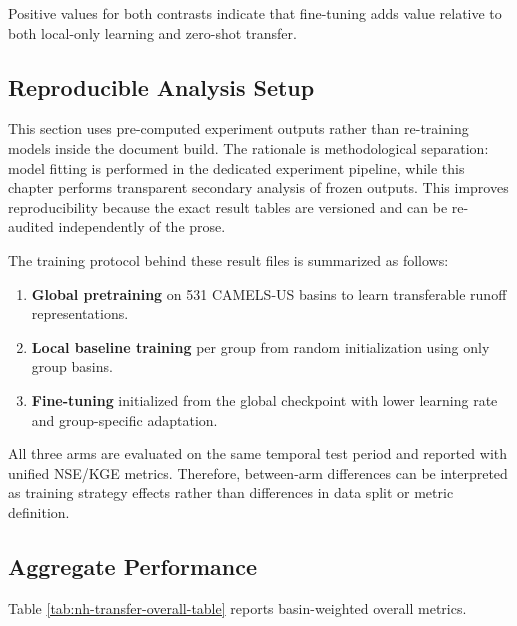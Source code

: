 \documentclass[
]{krantz}
\providecommand{\tightlist}{%
  \setlength{\itemsep}{0pt}\setlength{\parskip}{0pt}}
\begin{document}
Positive values for both contrasts indicate that fine-tuning adds value relative to
both local-only learning and zero-shot transfer.

\subsection{Reproducible Analysis Setup}\label{reproducible-analysis-setup}

This section uses pre-computed experiment outputs rather than re-training models inside
the document build. The rationale is methodological separation: model fitting is
performed in the dedicated experiment pipeline, while this chapter performs transparent
secondary analysis of frozen outputs. This improves reproducibility because the exact
result tables are versioned and can be re-audited independently of the prose.

The training protocol behind these result files is summarized as follows:

\begin{enumerate}
\def\labelenumi{\arabic{enumi}.}
\tightlist
\item
  \textbf{Global pretraining} on 531 CAMELS-US basins to learn transferable runoff
  representations.
\item
  \textbf{Local baseline training} per group from random initialization using only group
  basins.
\item
  \textbf{Fine-tuning} initialized from the global checkpoint with lower learning rate and
  group-specific adaptation.
\end{enumerate}

All three arms are evaluated on the same temporal test period and reported with unified
NSE/KGE metrics. Therefore, between-arm differences can be interpreted as training
strategy effects rather than differences in data split or metric definition.

\subsection{Aggregate Performance}\label{aggregate-performance}

Table \ref{tab:nh-transfer-overall-table} reports basin-weighted overall metrics.
\end{document}
